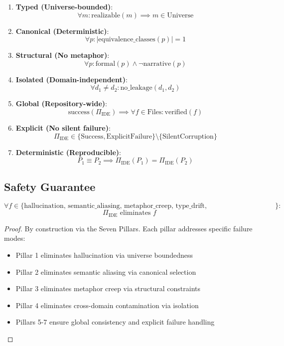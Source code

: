 \documentclass[12pt]{article}
\begin{document}
\begin{enumerate}
    \item \textbf{Typed (Universe-bounded)}:
    \[
    \forall m: \text{realizable}(m) \implies m \in \text{Universe}
    \]

    \item \textbf{Canonical (Deterministic)}:
    \[
    \forall p: |\text{equivalence\_classes}(p)| = 1
    \]

    \item \textbf{Structural (No metaphor)}:
    \[
    \forall p: \text{formal}(p) \land \neg \text{narrative}(p)
    \]

    \item \textbf{Isolated (Domain-independent)}:
    \[
    \forall d_1 \neq d_2: \text{no\_leakage}(d_1, d_2)
    \]

    \item \textbf{Global (Repository-wide)}:
    \[
    \text{success}(\Pi_{\text{IDE}}) \implies \forall f \in \text{Files}: \text{verified}(f)
    \]

    \item \textbf{Explicit (No silent failure)}:
    \[
    \Pi_{\text{IDE}} \in \{\text{Success}, \text{ExplicitFailure}\} \setminus \{\text{SilentCorruption}\}
    \]

    \item \textbf{Deterministic (Reproducible)}:
    \[
    P_1 \equiv P_2 \implies \Pi_{\text{IDE}}(P_1) = \Pi_{\text{IDE}}(P_2)
    \]
\end{enumerate}

\subsection{Safety Guarantee}

\begin{corollary}
\[
\forall f \in \{\text{hallucination, semantic\_aliasing, metaphor\_creep, type\_drift, cross\_domain\_contamination}\}:
\]
\[
\Pi_{\text{IDE}} \text{ eliminates } f
\]
\end{corollary}

\begin{proof}
By construction via the Seven Pillars. Each pillar addresses specific failure modes:
\begin{itemize}
    \item Pillar 1 eliminates hallucination via universe boundedness
    \item Pillar 2 eliminates semantic aliasing via canonical selection
    \item Pillar 3 eliminates metaphor creep via structural constraints
    \item Pillar 4 eliminates cross-domain contamination via isolation
    \item Pillars 5-7 ensure global consistency and explicit failure handling
\end{itemize}
\end{proof}
\end{document}
